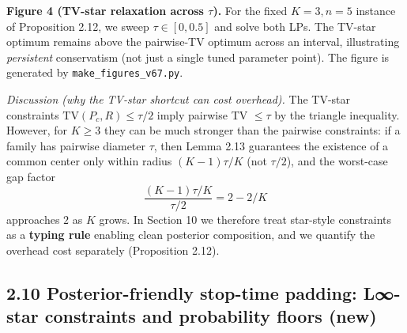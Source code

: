 \documentclass[11pt]{article}
\begin{document}
\textbf{Figure 4 (TV-star relaxation across \(\tau\)).} For the fixed
\(K=3,n=5\) instance of Proposition 2.12, we sweep \(\tau\in[0,0.5]\)
and solve both LPs. The TV-star optimum remains above the pairwise-TV
optimum across an interval, illustrating \emph{persistent} conservatism
(not just a single tuned parameter point). The figure is generated by
\texttt{make\_figures\_v67.py}.

\begin{center}
\end{center}

\emph{Discussion (why the TV-star shortcut can cost overhead).} The
TV-star constraints \(\mathrm{TV}(P_c,R)\le \tau/2\) imply pairwise TV
\(\le \tau\) by the triangle inequality. However, for \(K\ge 3\) they
can be much stronger than the pairwise constraints: if a family has
pairwise diameter \(\tau\), then Lemma 2.13 guarantees the existence of
a common center only within radius \((K-1)\tau/K\) (not \(\tau/2\)), and
the worst-case gap factor \[
\frac{(K-1)\tau/K}{\tau/2}=2-2/K
\] approaches \(2\) as \(K\) grows. In Section 10 we therefore treat
star-style constraints as a \textbf{typing rule} enabling clean
posterior composition, and we quantify the overhead cost separately
(Proposition 2.12).

\hypertarget{posterior-friendly-stop-time-padding-l-star-constraints-and-probability-floors-new}{%
\subsection{2.10 Posterior-friendly stop-time padding: L∞-star
constraints and probability floors
(new)}\label{posterior-friendly-stop-time-padding-l-star-constraints-and-probability-floors-new}}
\end{document}
